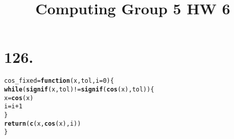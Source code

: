 \documentclass{article}\usepackage[]{graphicx}\usepackage[]{color}
\title{Computing Group 5 HW 6}
\makeatletter
\newcommand{\hlnum}[1]{\textcolor[rgb]{0.686,0.059,0.569}{#1}}%
\newcommand{\hlopt}[1]{\textcolor[rgb]{0,0,0}{#1}}%
\newcommand{\hlstd}[1]{\textcolor[rgb]{0.345,0.345,0.345}{#1}}%
\newcommand{\hlkwa}[1]{\textcolor[rgb]{0.161,0.373,0.58}{\textbf{#1}}}%
\newcommand{\hlkwb}[1]{\textcolor[rgb]{0.69,0.353,0.396}{#1}}%
\newcommand{\hlkwc}[1]{\textcolor[rgb]{0.333,0.667,0.333}{#1}}%
\newcommand{\hlkwd}[1]{\textcolor[rgb]{0.737,0.353,0.396}{\textbf{#1}}}%
\newenvironment{kframe}{%
 \def\at@end@of@kframe{}%
 \ifinner\ifhmode%
  \def\at@end@of@kframe{\end{minipage}}%
  \begin{minipage}{\columnwidth}%
 \fi\fi%
 \def\FrameCommand##1{\hskip\@totalleftmargin \hskip-\fboxsep
 \colorbox{shadecolor}{##1}\hskip-\fboxsep
     \hskip-\linewidth \hskip-\@totalleftmargin \hskip\columnwidth}%
 \MakeFramed {\advance\hsize-\width
   \@totalleftmargin\z@ \linewidth\hsize
   \@setminipage}}%
 {\par\unskip\endMakeFramed%
 \at@end@of@kframe}
\newenvironment{knitrout}{}{} %
\makeatother
\begin{document}
\maketitle

\section{126.}
\begin{knitrout}
\color{fgcolor}\begin{kframe}
\begin{alltt}
\hlstd{cos_fixed} \hlkwb{=} \hlkwa{function}\hlstd{(}\hlkwc{x}\hlstd{,} \hlkwc{tol}\hlstd{,} \hlkwc{i}\hlstd{=}\hlnum{0}\hlstd{)\{}
  \hlkwa{while}\hlstd{(}\hlkwd{signif}\hlstd{(x, tol)} \hlopt{!=} \hlkwd{signif}\hlstd{(}\hlkwd{cos}\hlstd{(x), tol))\{}
    \hlstd{x}\hlkwb{=}\hlkwd{cos}\hlstd{(x)}
    \hlstd{i}\hlkwb{=}\hlstd{i}\hlopt{+}\hlnum{1}
  \hlstd{\}}
  \hlkwd{return}\hlstd{(}\hlkwd{c}\hlstd{(x,} \hlkwd{cos}\hlstd{(x), i))}
\hlstd{\}}


\end{alltt}
\end{kframe}
\end{knitrout}
\end{document}
